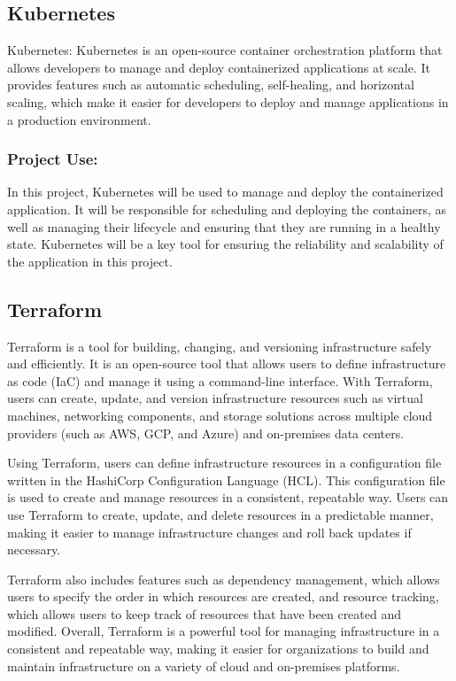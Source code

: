 \documentclass[
  10pt,
  paper=a4,
  ,captions=tableheading
]{scrartcl}
\begin{document}
\hypertarget{kubernetes}{%
\subsection{Kubernetes}\label{kubernetes}}

Kubernetes: Kubernetes is an open-source container orchestration
platform that allows developers to manage and deploy containerized
applications at scale. It provides features such as automatic
scheduling, self-healing, and horizontal scaling, which make it easier
for developers to deploy and manage applications in a production
environment.

\hypertarget{project-use-5}{%
\subsubsection{Project Use:}\label{project-use-5}}

In this project, Kubernetes will be used to manage and deploy the
containerized application. It will be responsible for scheduling and
deploying the containers, as well as managing their lifecycle and
ensuring that they are running in a healthy state. Kubernetes will be a
key tool for ensuring the reliability and scalability of the application
in this project.

\hypertarget{terraform}{%
\subsection{Terraform}\label{terraform}}

Terraform is a tool for building, changing, and versioning
infrastructure safely and efficiently. It is an open-source tool that
allows users to define infrastructure as code (IaC) and manage it using
a command-line interface. With Terraform, users can create, update, and
version infrastructure resources such as virtual machines, networking
components, and storage solutions across multiple cloud providers (such
as AWS, GCP, and Azure) and on-premises data centers.

Using Terraform, users can define infrastructure resources in a
configuration file written in the HashiCorp Configuration Language
(HCL). This configuration file is used to create and manage resources in
a consistent, repeatable way. Users can use Terraform to create, update,
and delete resources in a predictable manner, making it easier to manage
infrastructure changes and roll back updates if necessary.

Terraform also includes features such as dependency management, which
allows users to specify the order in which resources are created, and
resource tracking, which allows users to keep track of resources that
have been created and modified. Overall, Terraform is a powerful tool
for managing infrastructure in a consistent and repeatable way, making
it easier for organizations to build and maintain infrastructure on a
variety of cloud and on-premises platforms.
\end{document}
